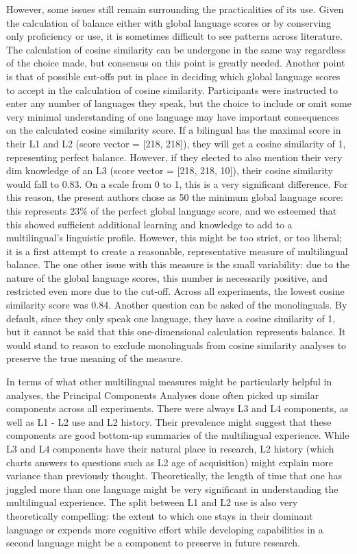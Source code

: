 However, some issues still remain surrounding the practicalities of its use. Given the calculation of balance either with global language scores or by conserving only proficiency or use, it is sometimes difficult to see patterns across literature. The calculation of cosine similarity can be undergone in the same way regardless of the choice made, but consensus on this point is greatly needed. Another point is that of possible cut-offs put in place in deciding which global language scores to accept in the calculation of cosine similarity. Participants were instructed to enter any number of languages they speak, but the choice to include or omit some very minimal understanding of one language may have important consequences on the calculated cosine similarity score. If a bilingual has the maximal score in their L1 and L2 (score vector = [218, 218]), they will get a cosine similarity of 1, representing perfect balance. However, if they elected to also mention their very dim knowledge of an L3 (score vector = [218, 218, 10]), their cosine similarity would fall to 0.83. On a scale from 0 to 1, this is a very significant difference. For this reason, the present authors chose as 50 the minimum global language score: this represents 23\% of the perfect global language score, and we esteemed that this showed sufficient additional learning and knowledge to add to a multilingual's linguistic profile. However, this might be too strict, or too liberal; it is a first attempt to create a reasonable, representative measure of multilingual balance. The one other issue with this measure is the small variability: due to the nature of the global language scores, this number is necessarily positive, and restricted even more due to the cut-off. Across all experiments, the lowest cosine similarity score was 0.84. Another question can be asked of the monolinguals. By default, since they only speak one language, they have a cosine similarity of 1, but it cannot be said that this one-dimensional calculation represents balance. It would stand to reason to exclude monolinguals from cosine similarity analyses to preserve the true meaning of the measure.

In terms of what other multilingual measures might be particularly helpful in analyses, the Principal Components Analyses done often picked up similar components across all experiments. There were always L3 and L4 components, as well as L1 - L2 use and L2 history. Their prevalence might suggest that these components are good bottom-up summaries of the multilingual experience. While L3 and L4 components have their natural place in research, L2 history (which charts answers to questions such as L2 age of acquisition) might explain more variance than previously thought. Theoretically, the length of time that one has juggled more than one language might be very significant in understanding the multilingual experience. The split between L1 and L2 use is also very theoretically compelling: the extent to which one stays in their dominant language or expends more cognitive effort while developing capabilities in a second language might be a component to preserve in future research. 

